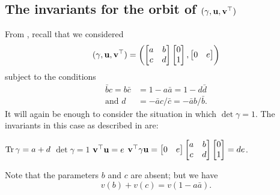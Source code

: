 \subsection{The invariants for the orbit of ${(\gamma, \mathbf u, \mathbf v^\top)}$}
From , recall that we considered
\[
  (\gamma, \mathbf u, \mathbf v^\top)
  =
  \left( \begin{bmatrix} a & b \\ c & d \end{bmatrix}
    \begin{bmatrix} 0 \\ 1 \end{bmatrix}, \begin{bmatrix} 0 & e \end{bmatrix} \right)
\]
subject to the conditions
\begin{align*}
  \bar b c = b \bar c &= 1 - a \bar a = 1 - d \bar d \\
  \text{and } d &= - \bar a c / \bar c = -\bar a b / \bar b.
\end{align*}
It will again be enough to consider the situation in which $\det \gamma = 1$.
The invariants in this case as described in  are:
\begin{itemize}
  \ii $\operatorname{Tr} \gamma = a + d$
  \ii $\det \gamma = 1$
  \ii $\mathbf v^\top \mathbf u = e$
  \ii $\mathbf v^\top \gamma \mathbf u = \begin{bmatrix} 0 & e \end{bmatrix}
  \begin{bmatrix} a & b \\ c & d \end{bmatrix} \begin{bmatrix} 0 \\ 1 \end{bmatrix} = de$.
\end{itemize}
Note that the parameters $b$ and $c$ are absent; but we have
\[ v(b) + v(c) = v(1 - a \bar a). \]

